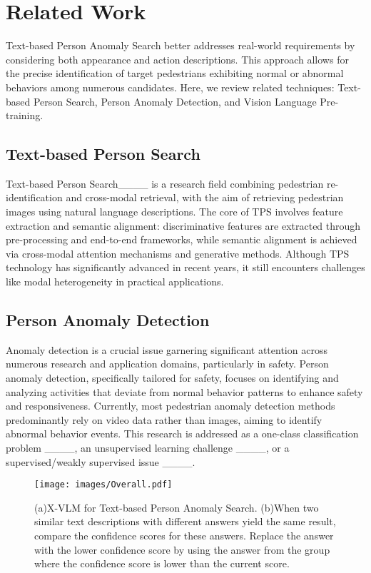 \section{Related Work}
\label{sec:realted work}
Text-based Person Anomaly Search better addresses real-world requirements by considering both appearance and action descriptions. This approach allows for the precise identification of target pedestrians exhibiting normal or abnormal behaviors among numerous candidates. Here, we review related techniques: Text-based Person Search, Person Anomaly Detection, and Vision Language Pre-training.

\subsection{Text-based Person Search}
Text-based Person Search____ is a research field combining pedestrian re-identification and cross-modal retrieval, with the aim of retrieving pedestrian images using natural language descriptions. The core of TPS involves feature extraction and semantic alignment: discriminative features are extracted through pre-processing and end-to-end frameworks, while semantic alignment is achieved via cross-modal attention mechanisms and generative methods. Although TPS technology has significantly advanced in recent years, it still encounters challenges like modal heterogeneity in practical applications.

\subsection{Person Anomaly Detection}
Anomaly detection is a crucial issue garnering significant attention across numerous research and application domains, particularly in safety. Person anomaly detection, specifically tailored for safety, focuses on identifying and analyzing activities that deviate from normal behavior patterns to enhance safety and responsiveness. Currently, most pedestrian anomaly detection methods predominantly rely on video data rather than images, aiming to identify abnormal behavior events. This research is addressed as a one-class classification problem ____, an unsupervised learning challenge ____, or a supervised/weakly supervised issue ____.

\begin{figure*}[tbh]
  \centering
  \texttt{[image: images/Overall.pdf]}
  \caption{(a)X-VLM for Text-based Person Anomaly Search. (b)When two similar text descriptions with different answers yield the same result, compare the confidence scores for these answers. Replace the answer with the lower confidence score by using the answer from the group where the confidence score is lower than the current score.}
  \label{fig: Overall}
\end{figure*}


